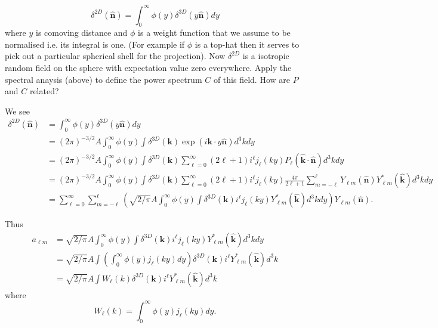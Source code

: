 \documentclass[11pt]{article}
\begin{document}
\begin{equation}
\delta^{2D}(\boldsymbol{\hat{n}}) = \int_0^{\infty} \phi(y) \delta^{3D}(y \boldsymbol{\hat{n}}) dy
\end{equation}
where $y$ is comoving distance and $\phi$ is a weight function that we assume to be normalised i.e. its integral is one. (For example if $\phi$ is a top-hat then it serves to pick out a particular spherical shell for the projection). Now $\delta^{2D}$ is a isotropic random field on the sphere with expectation value zero everywhere. Apply the spectral anaysis (above) to define the power spectrum $C$ of this field. How are $P$ and $C$ related?

We see
\begin{equation}
\begin{split}
\delta^{2D}(\boldsymbol{\hat{n}}) &= \int_0^{\infty} \phi(y) \delta^{3D}(y \boldsymbol{\hat{n}}) dy \\
&= (2\pi)^{-3/2} A \int_0^{\infty} \phi(y) \int \delta^{3D}(\boldsymbol{k}) \exp(i \boldsymbol{k} \cdot y\boldsymbol{\hat{n}}) d^3k dy \\
&= (2\pi)^{-3/2} A \int_0^{\infty} \phi(y) \int \delta^{3D}(\boldsymbol{k}) \sum_{\ell=0}^\infty (2 \ell +1) i^{\ell} j_{\ell}(ky) P_{\ell}(\boldsymbol{\hat{k}} \cdot \boldsymbol{\hat{n}}) d^3k dy \\
&= (2\pi)^{-3/2} A \int_0^{\infty} \phi(y) \int \delta^{3D}(\boldsymbol{k}) \sum_{\ell=0}^\infty (2 \ell +1) i^{\ell} j_{\ell}(ky) \frac{4 \pi}{2 \ell + 1}\sum_{m=-\ell}^{\ell} Y_{\ell m}(\boldsymbol{\hat{n}}) Y_{\ell m}^{\ast}(\boldsymbol{\hat{k}}) d^3k dy \\
&= \sum_{\ell=0}^\infty \sum_{m=-\ell}^{\ell} \left( \sqrt{2/\pi} A \int_0^{\infty} \phi(y) \int \delta^{3D}(\boldsymbol{k}) i^{\ell} j_{\ell}(ky)  Y_{\ell m}^{\ast}(\boldsymbol{\hat{k}}) d^3k dy \right) Y_{\ell m}(\boldsymbol{\hat{n}}).
\end{split}
\end{equation}

Thus
\begin{equation}
\begin{split}
a_{\ell m} &= \sqrt{2/\pi} A \int_0^{\infty} \phi(y) \int \delta^{3D}(\boldsymbol{k}) i^{\ell} j_{\ell}(ky)  Y_{\ell m}^{\ast}(\boldsymbol{\hat{k}}) d^3k dy \\
&= \sqrt{2/\pi} A \int \left( \int_0^{\infty} \phi(y) j_{\ell}(ky) dy \right) \delta^{3D}(\boldsymbol{k}) i^{\ell}   Y_{\ell m}^{\ast}(\boldsymbol{\hat{k}}) d^3k  \\
&= \sqrt{2/\pi} A \int W_{\ell}(k) \delta^{3D}(\boldsymbol{k}) i^{\ell}   Y_{\ell m}^{\ast}(\boldsymbol{\hat{k}}) d^3k 
\end{split}
\end{equation}
where
\begin{equation}
W_{\ell}(k) = \int_0^{\infty} \phi(y) j_{\ell}(ky) dy.
\end{equation}
\end{document}

